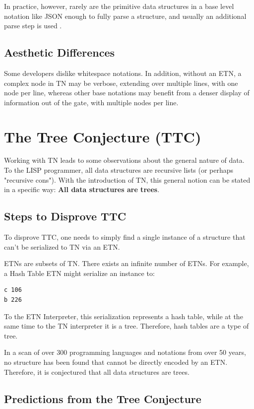 \documentclass[journal]{IEEEtran}
\begin{document}
In practice, however, rarely are the primitive data structures in a base level notation like JSON enough to fully parse a structure, and usually an additional parse step is used \cite{Ooms}.

\subsection{Aesthetic Differences}

Some developers dislike whitespace notations. In addition, without an ETN, a complex node in TN may be verbose, extending over multiple lines, with one node per line, whereas other base notations may benefit from a denser display of information out of the gate, with multiple nodes per line.

\section{The Tree Conjecture (TTC)}

Working with TN leads to some observations about the general nature of data. To the LISP programmer, all data structures are recursive lists (or perhaps "recursive cons"). With the introduction of TN, this general notion can be stated in a specific way: \textbf{All data structures are trees}.

\subsection{Steps to Disprove TTC}

To disprove TTC, one needs to simply find a single instance of a structure that can't be serialized to TN via an ETN.

ETNs are subsets of TN. There exists an infinite number of ETNs. For example, a Hash Table ETN might serialize an instance to:

\begin{lstlisting}
c 106
b 226
\end{lstlisting}

To the ETN Interpreter, this serialization represents a hash table, while at the same time to the TN interpreter it is a tree. Therefore, hash tables are a type of tree.

In a scan of over 300 programming languages and notations from over 50 years, no structure has been found that cannot be directly encoded by an ETN. Therefore, it is conjectured that all data structures are trees.

\subsection{Predictions from the Tree Conjecture}
\end{document}
